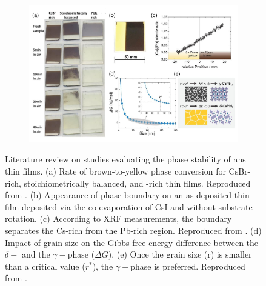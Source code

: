 \begin{figure}[htbp]
    \centering
    \begin{subfigure}[t]{0.99\textwidth}
        \centering
        \includegraphics[width=\textwidth]{chapters/stability/imeges/Stability_Lierature.pdf} %
    \end{subfigure}

    \caption[Literature review on studies evaluating the phase stability of  ans  thin films.]{Literature review on studies evaluating the phase stability of  ans  thin films. (a) Rate of brown-to-yellow phase conversion for CsBr-rich, stoichiometrically balanced, and -rich  thin films. Reproduced from \cite{Ma2017TheCells}. (b) Appearance of phase boundary on an as-deposited  thin film deposited via the co-evaporation of CsI and  without substrate rotation. (c) According to XRF measurements, the boundary separates the Cs-rich from the Pb-rich region. Reproduced from \cite{Becker2019LowExperimentation}. (d) Impact of grain size on the Gibbs free energy difference between the $\delta-$ and the $\gamma-$phase ($\Delta G$).  (e) Once the grain size (r) is smaller than a critical value ($r^*$), the $\gamma-$phase is preferred. Reproduced from \cite{Dong2023GrowthFilm}. }
    \label{fig:stability:literature_review}
\end{figure}


